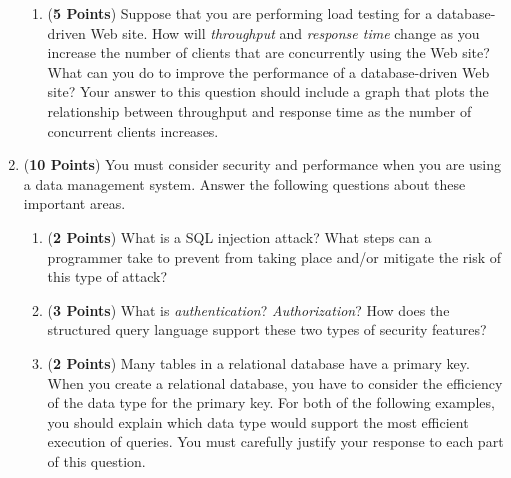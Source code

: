 \documentclass[12pt]{article}
\begin{document}
\begin{enumerate}
\begin{enumerate}

    \item ({\bf 5 Points}) Suppose that you are performing load
      testing for a database-driven Web site.  How will {\em
        throughput} and {\em response time} change as you increase the
      number of clients that are concurrently using the Web site?
      What can you do to improve the performance of a database-driven
      Web site?  Your answer to this question should include a graph
      that plots the relationship between throughput and response time
      as the number of concurrent clients increases.

    \end{enumerate}

\newpage

\item ({\bf 10 Points}) You must consider security and performance
  when you are using a data management system.  Answer the following
  questions about these important areas.

  \begin{enumerate}
    
    \item ({\bf 2 Points}) What is a SQL injection attack? What steps
      can a programmer take to prevent from taking place and/or
      mitigate the risk of this type of attack?

    \item ({\bf 3 Points}) What is {\em authentication}?  {\em
      Authorization}?  How does the structured query language support
      these two types of security features?


    \item ({\bf 2 Points}) Many tables in a relational database have a primary key.  When you create a relational
      database, you have to consider the efficiency of the data type for the primary key.  For both of the following
      examples, you should explain which data type would support the most efficient execution of queries.  You must
      carefully justify your response to each part of this question.


\end{enumerate}
\end{enumerate}
\end{document}
